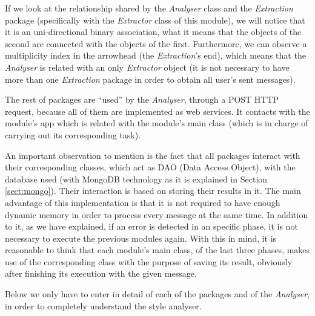 If we look at the relationship shared by the \textit{Analyser} class and the \textit{Extraction} package (specifically with the \textit{Extractor} class of this module), we will notice that it is an uni-directional binary association, what it means that the objects of the second are connected with the objects of the first. Furthermore, we can observe a multiplicity index in the arrowhead (the \textit{Extraction}'s end), which means that the \textit{Analyser} is related with an only \textit{Extractor} object (it is not necessary to have more than one \textit{Extraction} package in order to obtain all user's sent messages).

The rest of packages are ``used'' by the \textit{Analyser}, through a POST HTTP request, because all of them are implemented as web services. It contacts with the module's app which is related with the module's main class (which is in charge of carrying out its corresponding task).

An important observation to mention is the fact that all packages interact with their corresponding classes, which act as DAO (Data Access Object), with the database used (with MongoDB technology as it is explained in Section \ref{sect:mongo}). Their interaction is based on storing their results in it. The main advantage of this implementation is that it is not required to have enough dynamic memory in order to process every message at the same time. In addition to it, as we have explained, if an error is detected in an specific phase, it is not necessary to execute the previous modules again. With this in mind, it is reasonable to think that each module's main class, of the last three phases, makes use of the corresponding class with the purpose of saving its result, obviously after finishing its execution with the given message.

Below we only have to enter in detail of each of the packages and of the \textit{Analyser}, in order to completely understand the style analyser.